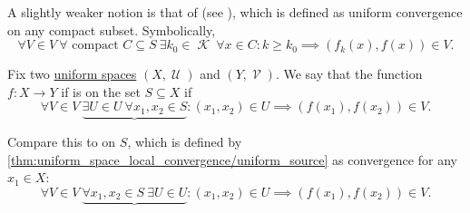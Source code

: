 \begin{definition}
  A slightly weaker notion is that of  (see \cite{ProofWiki:compact_convergence}), which is defined as uniform convergence on any compact subset. Symbolically,
  \begin{equation}\label{def:function_net_convergence/compact}
    \forall V \in V \ \forall \text{ compact } C \subseteq S \ \exists k_0 \in \mscrK \ \forall x \in C : k \geq k_0 \implies (f_k(x), f(x)) \in V.
  \end{equation}
\end{definition}

\begin{definition}\label{def:uniform_continuity}
  Fix two \hyperref[def:uniform_space]{uniform spaces} \( (X, \mscrU) \) and \( (Y, \mscrV) \). We say that the function \( f: X \to Y \) if is  on the set \( S \subseteq X \) if
  \begin{equation}\label{def:uniform_continuity/uniform}
    \forall V \in V \ \underbrace{\exists U \in U \ \forall x_1, x_2 \in S} : (x_1, x_2) \in U \implies (f(x_1), f(x_2)) \in V.
  \end{equation}

  Compare this to  on \( S \), which is defined by \cref{thm:uniform_space_local_convergence/uniform_source} as convergence for any \( x_1 \in X \):
  \begin{equation}\label{def:uniform_continuity/pointwise}
    \forall V \in V \ \underbrace{\forall x_1, x_2 \in S \ \exists U \in U} : (x_1, x_2) \in U \implies (f(x_1), f(x_2)) \in V.
  \end{equation}
\end{definition}

